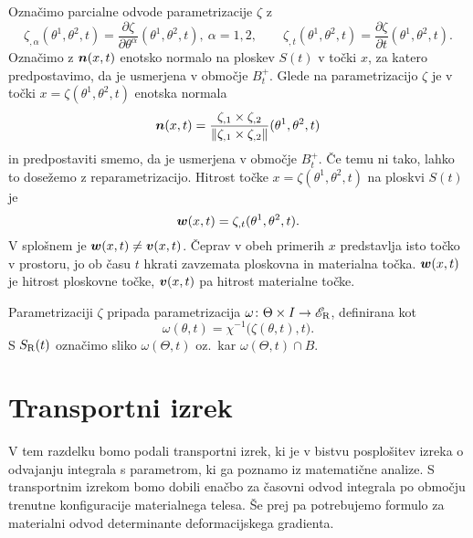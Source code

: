 Označimo parcialne odvode parametrizacije $\zeta$ z
\[
	\zeta_{,\alpha}(\theta^1,\theta^2,t)=\frac{\partial\zeta}{\partial\theta^{\alpha}}(\theta^1,\theta^2,t),\ \alpha=1,2,\qquad
	\zeta_{,t}(\theta^1,\theta^2,t)=\frac{\partial\zeta}{\partial t}(\theta^1,\theta^2,t).
\]
Označimo z $\boldsymbol n(x,t)$ enotsko normalo na ploskev $S(t)$ v točki $x$, za katero predpostavimo,
da je usmerjena v območje $B_t^+$. Glede na parametrizacijo $\zeta$ je v točki $x=\zeta(\theta^1,\theta^2,t)$
enotska normala
\[
	\boldsymbol n(x,t)=
	\frac{\zeta_{,1}\times\zeta_{,2}}{\displaystyle\left\| \zeta_{,1}\times\zeta_{,2} \right\|}(\theta^1,\theta^2,t)
\]
in predpostaviti smemo, da je usmerjena v območje $B_t^+$. Če temu ni tako, lahko to
dosežemo z reparametrizacijo. Hitrost točke $x=\zeta(\theta^1,\theta^2,t)$ na ploskvi $S(t)$ je
\[
	\boldsymbol w(x,t)=\zeta_{,t}(\theta^1,\theta^2,t).
\]
V splošnem je $\boldsymbol w(x,t)\neq\boldsymbol v(x,t)$. Čeprav v obeh primerih $x$ predstavlja isto točko
v prostoru, jo ob času $t$ hkrati zavzemata ploskovna in materialna točka.
$\boldsymbol w(x,t)$ je hitrost ploskovne točke, $\boldsymbol v(x,t)$ pa hitrost materialne točke.

Parametrizaciji $\zeta$ pripada parametrizacija $\omega\colon\Theta\times I\to\mathscr E_{\mathrm R}$, definirana kot
\[ \omega(\theta,t)=\chi^{-1}\big(\zeta(\theta,t),t\big). \]
S $S_{\mathrm R}(t)$ označimo sliko $\omega(\Theta, t)$ oz.~kar $\omega(\Theta, t)\cap B$.





\section{Transportni izrek}


V tem razdelku bomo podali transportni izrek, ki je v bistvu posplošitev izreka o odvajanju
integrala s parametrom, ki ga poznamo iz matematične analize. S transportnim izrekom
bomo dobili enačbo za časovni odvod integrala po območju trenutne konfiguracije materialnega telesa.
Še prej pa potrebujemo formulo za materialni odvod determinante deformacijskega gradienta.

